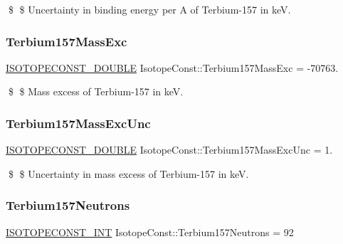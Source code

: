 \$ \$ Uncertainty in binding energy per A of Terbium-\/157 in keV. \mbox{\label{group___isotope_const-_terbium-_tb157_ga79514ba4e310367f50025edf13e921c9}} 
\subsubsection{\texorpdfstring{Terbium157\+Mass\+Exc}{Terbium157MassExc}}
{\footnotesize\ttfamily \mbox{\hyperlink{group___isotope_const-_macros_ga8f45a7272ce02c0b4c65c44636ed719a}{I\+S\+O\+T\+O\+P\+E\+C\+O\+N\+S\+T\+\_\+\+D\+O\+U\+B\+LE}} Isotope\+Const\+::\+Terbium157\+Mass\+Exc = -\/70763.}

\$ \$ Mass excess of Terbium-\/157 in keV. \mbox{\label{group___isotope_const-_terbium-_tb157_gac8c0a73d4678da332833ce9ae5da7552}} 
\subsubsection{\texorpdfstring{Terbium157\+Mass\+Exc\+Unc}{Terbium157MassExcUnc}}
{\footnotesize\ttfamily \mbox{\hyperlink{group___isotope_const-_macros_ga8f45a7272ce02c0b4c65c44636ed719a}{I\+S\+O\+T\+O\+P\+E\+C\+O\+N\+S\+T\+\_\+\+D\+O\+U\+B\+LE}} Isotope\+Const\+::\+Terbium157\+Mass\+Exc\+Unc = 1.}

\$ \$ Uncertainty in mass excess of Terbium-\/157 in keV. \mbox{\label{group___isotope_const-_terbium-_tb157_ga31b5c0f8ba5db8fcda352d6340b4ae1a}} 
\subsubsection{\texorpdfstring{Terbium157\+Neutrons}{Terbium157Neutrons}}
{\footnotesize\ttfamily \mbox{\hyperlink{group___isotope_const-_macros_ga5f18360b3e99483a35c32d789e62621c}{I\+S\+O\+T\+O\+P\+E\+C\+O\+N\+S\+T\+\_\+\+I\+NT}} Isotope\+Const\+::\+Terbium157\+Neutrons = 92}

